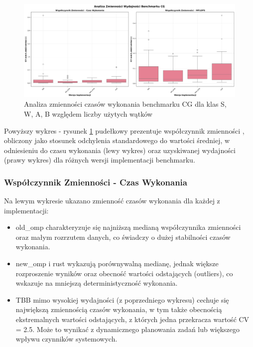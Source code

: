 \begin{figure}[H]
    \centering
    \includegraphics[width=\textwidth]{analiza/images/parallel/cg/cg_analiza_zmiennosci.png}
    \caption{Analiza zmienności czasów wykonania benchmarku CG dla klas S, W, A, B względem liczby użytych wątków}
    \label{cg_analiza_zmiennosci}
\end{figure}
Powyższy wykres - rysunek \ref{cg_analiza_zmiennosci} pudełkowy prezentuje współczynnik zmienności , obliczony jako stosunek odchylenia standardowego do wartości średniej, w odniesieniu do czasu wykonania (lewy wykres) oraz uzyskiwanej wydajności (prawy wykres) dla różnych wersji implementacji benchmarku.

\subsubsection{Współczynnik Zmienności - Czas Wykonania}
Na lewym wykresie ukazano zmienność czasów wykonania dla każdej z implementacji:
\begin{itemize}
    \item old\_omp charakteryzuje się najniższą medianą współczynnika zmienności oraz małym rozrzutem danych, co świadczy o dużej stabilności czasów wykonania.
    \item new\_omp i rust wykazują porównywalną medianę, jednak większe rozproszenie wyników oraz obecność wartości odstających (outliers), co wskazuje na mniejszą deterministyczność wykonania.
    \item TBB mimo wysokiej wydajności (z poprzedniego wykresu) cechuje się największą zmiennością czasów wykonania, w tym także obecnością ekstremalnych wartości odstających, z których jedna przekracza wartość CV = 2.5. Może to wynikać z dynamicznego planowania zadań lub większego wpływu czynników systemowych.
\end{itemize}

